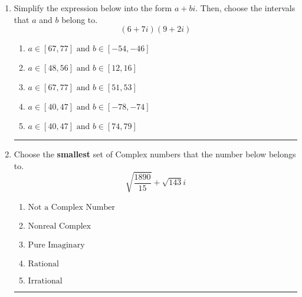 \documentclass[14pt]{extbook}
\newcommand{\litem}[1]{\item#1\hspace*{-1cm}\rule{\textwidth}{0.4pt}}
\begin{document}
\begin{enumerate}
{\begin{enumerate}[label=\Alph*.]
\end{enumerate} }
\litem{
Simplify the expression below into the form $a+bi$. Then, choose the intervals that $a$ and $b$ belong to.\[ (6 + 7 i)(9 + 2 i) \]\begin{enumerate}[label=\Alph*.]
\item \( a \in [67, 77] \text{ and } b \in [-54, -46] \)
\item \( a \in [48, 56] \text{ and } b \in [12, 16] \)
\item \( a \in [67, 77] \text{ and } b \in [51, 53] \)
\item \( a \in [40, 47] \text{ and } b \in [-78, -74] \)
\item \( a \in [40, 47] \text{ and } b \in [74, 79] \)

\end{enumerate} }
\litem{
Choose the \textbf{smallest} set of Complex numbers that the number below belongs to.\[ \sqrt{\frac{1890}{15}}+\sqrt{143} i \]\begin{enumerate}[label=\Alph*.]
\item \( \text{Not a Complex Number} \)
\item \( \text{Nonreal Complex} \)
\item \( \text{Pure Imaginary} \)
\item \( \text{Rational} \)
\item \( \text{Irrational} \)

\end{enumerate} }
\end{enumerate}
\end{document}
